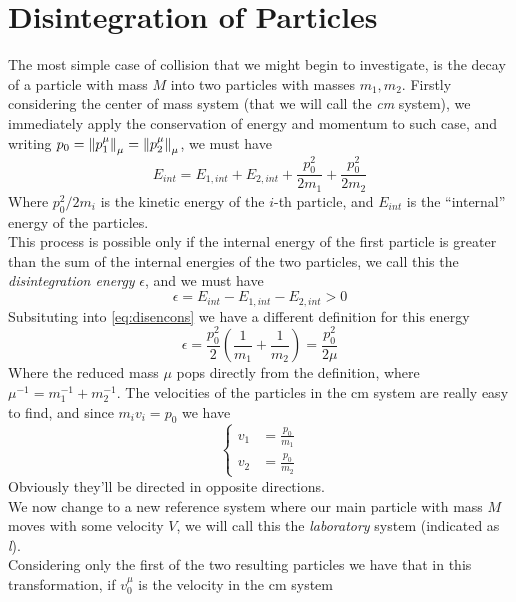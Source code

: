 \documentclass[../admech.tex]{subfiles}
\begin{document}
\section{Disintegration of Particles}
The most simple case of collision that we might begin to investigate, is the decay of a particle with mass $M$ into two particles with masses $m_1,m_2$. Firstly considering the center of mass system (that we will call the \emph{cm} system), we immediately apply the conservation of energy and momentum to such case, and writing $p_0=\norm{p_1^\mu}_\mu=\norm{p_2^\mu}_\mu$, we must have
\begin{equation}
	E_{int}=E_{1,int}+E_{2,int}+\frac{p_0^2}{2m_1}+\frac{p_0^2}{2m_2}
	\label{eq:disencons}
\end{equation}
Where $p_0^2/2m_i$ is the kinetic energy of the $i$-th particle, and $E_{int}$ is the ``internal'' energy of the particles.\\
This process is possible only if the internal energy of the first particle is greater than the sum of the internal energies of the two particles, we call this the \emph{disintegration energy} $\epsilon$, and we must have
\begin{equation}
	\epsilon=E_{int}-E_{1,int}-E_{2,int}>0
	\label{eq:disen}
\end{equation}
Subsituting into \eqref{eq:disencons} we have a different definition for this energy
\begin{equation}
	\epsilon=\frac{p_0^2}{2}\left( \frac{1}{m_1}+\frac{1}{m_2} \right)=\frac{p_0^2}{2\mu}
	\label{eq:disenrmass}
\end{equation}
Where the reduced mass $\mu$ pops directly from the definition, where $\mu^{-1}=m_1^{-1}+m_2^{-1}$. The velocities of the particles in the cm system are really easy to find, and since $m_iv_i=p_0$ we have
\begin{equation}
	\left\{ \begin{aligned}
			v_1&=\frac{p_0}{m_1}\\
			v_2&=\frac{p_0}{m_2}
	\end{aligned}\right.
	\label{eq:velcmsysdecay}
\end{equation}
Obviously they'll be directed in opposite directions.\\
We now change to a new reference system where our main particle with mass $M$ moves with some velocity $V$, we will call this the \emph{laboratory} system (indicated as \emph{l}).\\
Considering only the first of the two resulting particles we have that in this transformation, if $v_0^\mu$ is the velocity in the cm system
\end{document}
